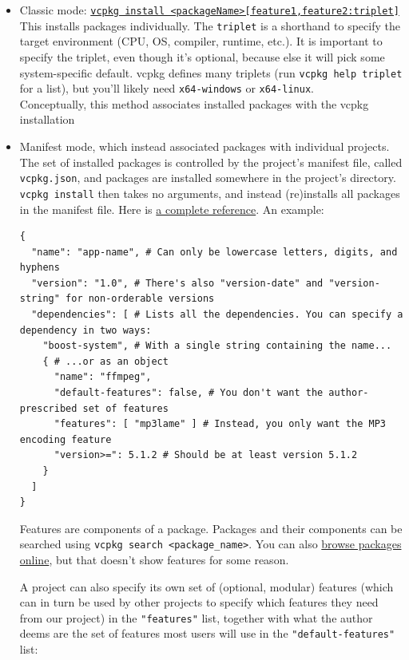 \documentclass[table, xcdraw]{article}%
\begin{document}
\begin{itemize}
    \item Classic mode: \href{https://vcpkg.io/en/docs/commands/install.html}{\texttt{vcpkg install <packageName>[feature1,feature2:triplet]}}\\
    This installs packages individually. The \texttt{triplet} is a shorthand to specify the target environment (CPU, OS, compiler, runtime, etc.). It is important to specify the triplet, even though it's optional, because else it will pick some system-specific default. vcpkg defines many triplets (run \texttt{vcpkg help triplet} for a list), but you'll likely need \texttt{x64-windows} or \texttt{x64-linux}.\\
    Conceptually, this method associates installed packages with the vcpkg installation
    \item Manifest mode, which instead associated packages with individual projects. The set of installed packages is controlled by the project's manifest file, called \texttt{vcpkg.json}, and packages are installed somewhere in the project's directory. \texttt{vcpkg install} then takes no arguments, and instead (re)installs all packages in the manifest file. Here is \href{https://learn.microsoft.com/en-us/vcpkg/reference/vcpkg-json}{a complete reference}. An example:
    
    \begin{verbatim}
{
  "name": "app-name", # Can only be lowercase letters, digits, and hyphens
  "version": "1.0", # There's also "version-date" and "version-string" for non-orderable versions
  "dependencies": [ # Lists all the dependencies. You can specify a dependency in two ways:
    "boost-system", # With a single string containing the name...
    { # ...or as an object
      "name": "ffmpeg",
      "default-features": false, # You don't want the author-prescribed set of features
      "features": [ "mp3lame" ] # Instead, you only want the MP3 encoding feature
      "version>=": 5.1.2 # Should be at least version 5.1.2
    }
  ]
}
    \end{verbatim}
    
    Features are components of a package. Packages and their components can be searched using \texttt{vcpkg search <package_name>}. You can also \href{https://vcpkg.io/en/packages.html}{browse packages online}, but that doesn't show features for some reason.
    
    A project can also specify its own set of (optional, modular) features (which can in turn be used by other projects to specify which features they need from our project) in the \texttt{"features"} list, together with what the author deems are the set of features most users will use in the \texttt{"default-features"} list:
    

\end{itemize}
\end{document}
